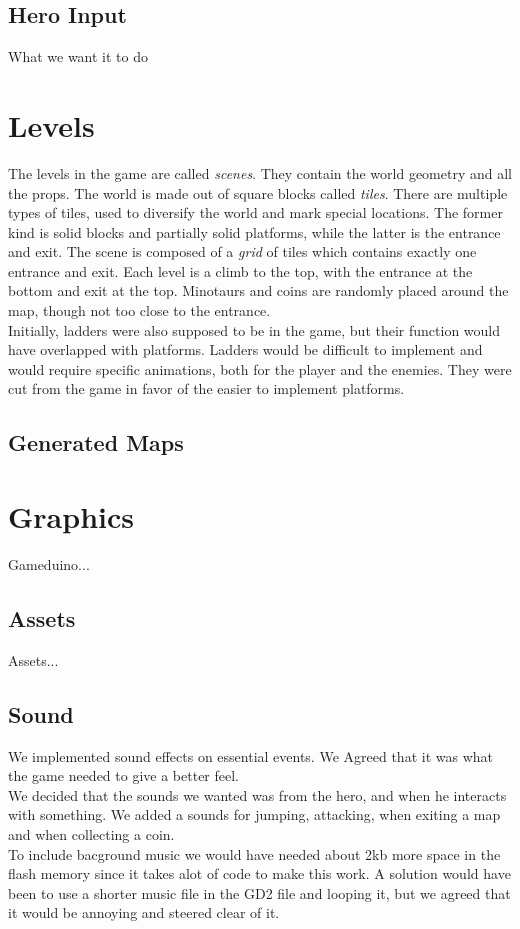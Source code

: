 \subsection{Hero Input}
What we want it to do

\section{Levels} %
The levels in the game are called \emph{scenes}. They contain the world geometry and all the props. The world is made out of square blocks called \emph{tiles}. There are multiple types of tiles, used to diversify the world and mark special locations. The former kind is solid blocks and partially solid platforms, while the latter is the entrance and exit. The scene is composed of a \emph{grid} of tiles which contains exactly one entrance and exit. Each level is a climb to the top, with the entrance at the bottom and exit at the top. Minotaurs and coins are randomly placed around the map, though not too close to the entrance.\\
Initially, ladders were also supposed to be in the game, but their function would have overlapped with platforms. Ladders would be difficult to implement and would require specific animations, both for the player and the enemies. They were cut from the game in favor of the easier to implement platforms.

\subsection{Generated Maps}

\section{Graphics}
Gameduino...

\subsection{Assets}
Assets...

\subsection{Sound} %

We implemented sound effects on essential events. We Agreed that it was what the game needed to give a better feel.\\
We decided that the sounds we wanted was from the hero, and when he interacts with something. We added a sounds for jumping, attacking, when exiting a map and when collecting a coin.\\
To include bacground music we would have needed about 2kb more space in the flash memory since it takes alot of code to make this work. A solution would have been to use a shorter music file in the GD2 file and looping it, but we agreed that it would be annoying and steered clear of it.

